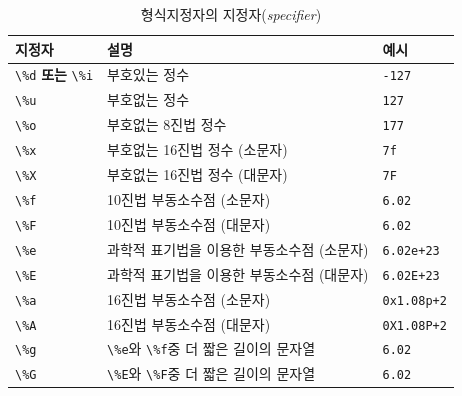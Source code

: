 \documentclass[a4paper,12pt]{book}
\newcommand{\V}[1]{\Verb|#1|}
\begin{document}
\begingroup
    \centering
    \begin{longtable}{ || m{6em} || m{17em} | m{6em} || }
        \caption{형식지정자의 지정자(\textit{specifier})}
        \label{Tab:format-specifier}

        \hline 지정자                        & 설명                                                                 & 예시 \\
        \hline
        \hline \V{\%d} \textbf{또는} \V{\%i} & 부호있는 정수                                                        & \V{-127} \\
        \hline \V{\%u}                       & 부호없는 정수                                                        & \V{127} \\
        \hline \V{\%o}                       & 부호없는 8진법 정수                                                  & \V{177} \\
        \hline \V{\%x}                       & 부호없는 16진법 정수 (소문자)                                        & \V{7f} \\
        \hline \V{\%X}                       & 부호없는 16진법 정수 (대문자)                                        & \V{7F} \\
        \hline \V{\%f}                       & 10진법 부동소수점 (소문자)                                           & \V{6.02} \\
        \hline \V{\%F}                       & 10진법 부동소수점 (대문자)                                           & \V{6.02} \\
        \hline \V{\%e}                       & 과학적 표기법을 이용한 부동소수점 (소문자)                           & \V{6.02e+23} \\
        \hline \V{\%E}                       & 과학적 표기법을 이용한 부동소수점 (대문자)                           & \V{6.02E+23} \\
        \hline \V{\%a}                       & 16진법 부동소수점 (소문자)                                           & \V{0x1.08p+2} \\
        \hline \V{\%A}                       & 16진법 부동소수점 (대문자)                                           & \V{0X1.08P+2} \\
        \hline \V{\%g}                       & \V{\%e}와 \V{\%f}중 더 짧은 길이의 문자열                            & \V{6.02} \\
        \hline \V{\%G}                       & \V{\%E}와 \V{\%F}중 더 짧은 길이의 문자열                            & \V{6.02} \\

\end{longtable}
\end{document}
